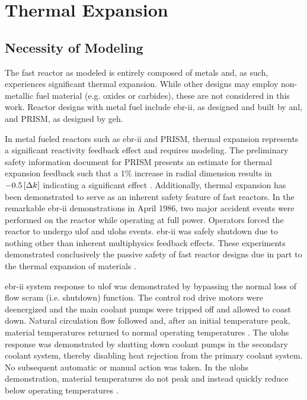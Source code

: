 \chapter{Thermal Expansion}
\label{ch:thermalExpansion}

\section{Necessity of Modeling}
  The fast reactor as modeled is entirely composed of metals and, as such,
  experiences significant thermal expansion. While other designs may employ
  non-metallic fuel material (e.g. oxides or carbides), these are not considered
  in this work. Reactor designs with metal fuel include \gls{ebr-ii}, as
  designed and built by \gls{anl}, and PRISM, as designed by \gls{geh}.

  In metal fueled reactors such as \gls{ebr-ii} and PRISM, thermal expansion
  represents a significant reactivity feedback effect and requires modeling.
  The preliminary safety information document for PRISM presents an estimate for
  thermal expansion feedback such that a 1\% increase in radial dimension
  results in $-0.5 \left[\text{{$\Delta k$}}\right]$ indicating a significant effect
  \cite{GEFR793}. Additionally, thermal expansion has been demonstrated to serve
  as an inherent safety feature of fast reactors. In the remarkable \gls{ebr-ii}
  demonstrations in April 1986, two major accident events were performed on the
  reactor while operating at full power. Operators forced the reactor to undergo
  \gls{ulof} and \gls{ulohs} events. \gls{ebr-ii} was safely shutdown due to
  nothing other than inherent multiphysics feedback effects. These experiments
  demonstrated conclusively the passive safety of fast reactor designs due in
  part to the thermal expansion of materials \cite{PlentifulEnergy}.

  \gls{ebr-ii} system response to \gls{ulof} was demonstrated by bypassing the
  normal loss of flow scram (i.e. shutdown) function. The control rod drive
  motors were deenergized and the main coolant pumps were tripped off and
  allowed to coast down. Natural circulation flow followed and, after an initial
  temperature peak, material temperatures returned to normal operating
  temperatures \cite{ebriitests}. The \gls{ulohs} response was demonstrated by
  shutting down coolant pumps in the secondary coolant system, thereby disabling
  heat rejection from the primary coolant system. No subsequent automatic or
  manual action was taken. In the \gls{ulohs} demonstration, material
  temperatures do not peak and instead quickly reduce below operating
  temperatures \cite{ebriitests}.

